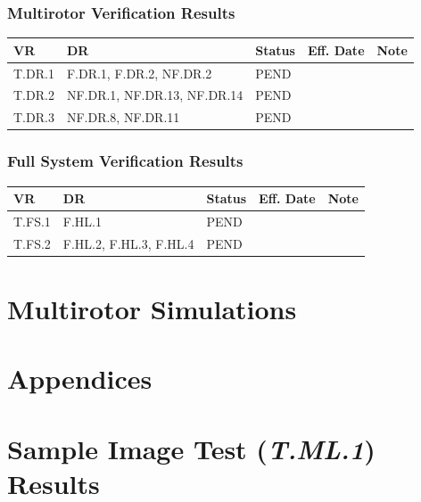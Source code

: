 \documentclass[10pt,letterpaper]{article}
\begin{document}
\subsubsection{Multirotor Verification Results}
\begin{table}[H]
	\centering
	\begin{tabular}{lllll}
	\hline
	\textbf{VR} & \textbf{DR} & \textbf{Status} & \textbf{Eff. Date} & \textbf{Note}\\
	\hline
    T.DR.1 & F.DR.1, F.DR.2, NF.DR.2 & PEND   & \\
    T.DR.2 & NF.DR.1, NF.DR.13, NF.DR.14  & PEND   & \\
	T.DR.3 & NF.DR.8, NF.DR.11 & PEND   & \\
	\hline
	\end{tabular}
\end{table}

\subsubsection{Full System Verification Results}
\begin{table}[H]
	\centering
	\begin{tabular}{lllll}
	\hline
	\textbf{VR} & \textbf{DR} & \textbf{Status} & \textbf{Eff. Date} & \textbf{Note}\\
	\hline
    T.FS.1 & F.HL.1  & PEND   & \\
	T.FS.2 & F.HL.2, F.HL.3, F.HL.4 & PEND   & \\
	\hline
	\end{tabular}
\end{table}

\section{Multirotor Simulations}
\label{mr_sims}


\clearpage
{}



 \clearpage
 \appendix
 \section*{Appendices}
 \section{Sample Image Test (\textit{T.ML.1}) Results}\label{appendix:T.ML.1}
 
\end{document}
